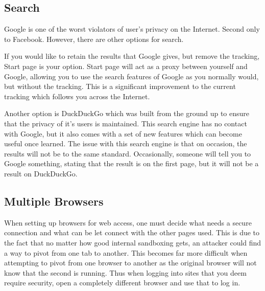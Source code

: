\documentclass[a4paper,11pt]{report}
\begin{document}
		\subsection{Search}
			Google is one of the worst violators of user's privacy on the Internet. Second only to Facebook. 
			However, there are other options for search. \par 
			If you would like to retain the results that Google gives, but remove the tracking, Start page is your option. 
			Start page will act as a proxy between yourself and Google, allowing you to use the search features of Google as you normally would, but without the tracking. 
			This is a significant improvement to the current tracking which follows you across the Internet. \par 
			Another option is DuckDuckGo which was built from the ground up to ensure that the privacy of it's users is maintained. 
			This search engine has no contact with Google, but it also comes with a set of new features which can become useful once learned. 
			The issue with this search engine is that on occasion, the results will not be to the same standard. 
			Occasionally, someone will tell you to Google something, stating that the result is on the first page, but it will not be a result on DuckDuckGo. 
		\subsection{Multiple Browsers}
			When setting up browsers for web access, one must decide what needs a secure connection and what can be let connect with the other pages used. 
			This is due to the fact that no matter how good internal sandboxing gets, an attacker could find a way to pivot from one tab to another. 
			This becomes far more difficult when attempting to pivot from one browser to another as the original browser will not know that the second is running. 
			Thus when logging into sites that you deem require security, open a completely different browser and use that to log in. 
\end{document}
